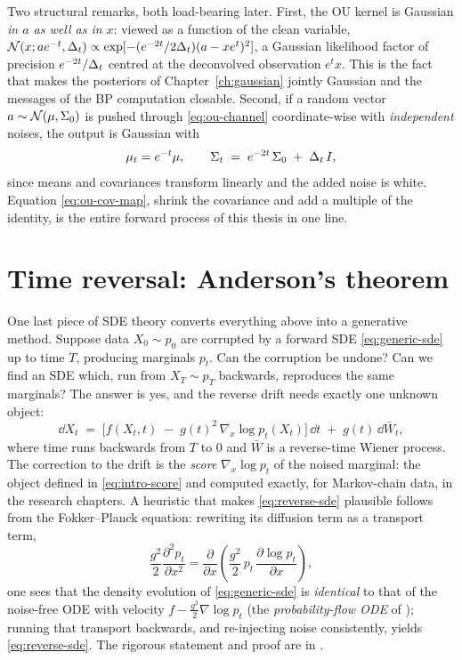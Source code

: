 Two structural remarks, both load-bearing later. First, the OU kernel is
Gaussian \emph{in $a$ as well as in $x$}: viewed as a function of the
clean variable,
$\mathcal{N}(x; a e^{-t}, \Delta_t) \propto
\exp[-(e^{-2t}/2\Delta_t)(a - x e^{t})^2]$, a Gaussian likelihood factor
of precision $e^{-2t}/\Delta_t$ centred at the deconvolved observation
$e^t x$. This is the fact that makes the posteriors of
Chapter~\ref{ch:gaussian} jointly Gaussian and the messages of the BP
computation closable. Second, if a random vector
$a \sim \mathcal{N}(\mu, \Sigma_0)$ is pushed through \eqref{eq:ou-channel}
coordinate-wise with \emph{independent} noises, the output is Gaussian
with
\begin{equation}
  \mu_t = e^{-t}\mu,
  \qquad
  \Sigma_t \;=\; e^{-2t}\, \Sigma_0 \;+\; \Delta_t\, I ,
  \label{eq:ou-cov-map}
\end{equation}
since means and covariances transform linearly and the added noise is
white. Equation \eqref{eq:ou-cov-map}, shrink the covariance and add a
multiple of the identity, is the entire forward process of this thesis in
one line.

\section{Time reversal: Anderson's theorem}\label{sec:reversal}

One last piece of SDE theory converts everything above into a generative
method. Suppose data $X_0 \sim p_0$ are corrupted by a forward SDE
\eqref{eq:generic-sde} up to time $T$, producing marginals $p_t$. Can the
corruption be undone? Can we find an SDE which, run from $X_T \sim p_T$
backwards, reproduces the same marginals? The answer
\citep{anderson1982reverse} is yes, and the reverse drift needs exactly
one unknown object:
\begin{equation}
  \dd X_t \;=\;
  \Big[ f(X_t, t) \;-\; g(t)^2\, \nabla_x \log p_t(X_t) \Big]\,\dd t
  \;+\; g(t)\, \dd \bar W_t ,
  \label{eq:reverse-sde}
\end{equation}
where time runs backwards from $T$ to $0$ and $\bar W$ is a reverse-time
Wiener process. The correction to the drift is the \emph{score}
$\nabla_x \log p_t$ of the noised marginal: the object defined in
\eqref{eq:intro-score} and computed exactly, for Markov-chain data, in
the research chapters. A heuristic that makes \eqref{eq:reverse-sde}
plausible follows from the Fokker--Planck equation: rewriting its
diffusion term as a transport term,
\begin{equation*}
  \frac{g^2}{2} \frac{\partial^2 p_t}{\partial x^2}
  = \frac{\partial}{\partial x}\!\left(
      \frac{g^2}{2}\, p_t\, \frac{\partial \log p_t}{\partial x}
    \right),
\end{equation*}
one sees that the density evolution of \eqref{eq:generic-sde} is
\emph{identical} to that of the noise-free ODE with velocity
$f - \tfrac{g^2}{2} \nabla \log p_t$ (the \emph{probability-flow ODE} of
\citealp{song2021scorebased}); running that transport backwards, and
re-injecting noise consistently, yields \eqref{eq:reverse-sde}. The
rigorous statement and proof are in \citet{anderson1982reverse}.

